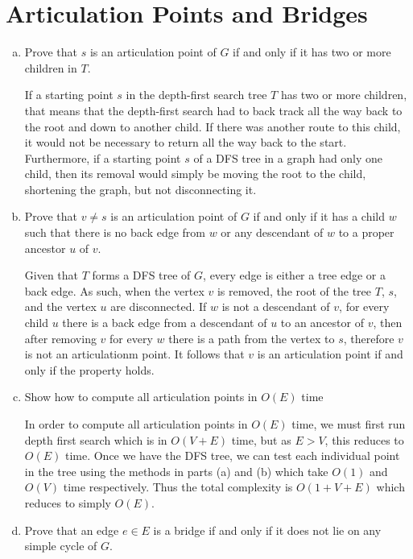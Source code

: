 \documentclass[12pt]{article}
\begin{document}
\section{Articulation Points and Bridges}\label{articulation points}
\begin{enumerate}[(a)]
\item Prove that $s$ is an articulation point of $G$ if and only if it has two or more children in $T$.
\begin{addmargin}[2em]{2em}
If a starting point $s$ in the depth-first search tree $T$ has two or more children, that means that the depth-first search had to back track all the way back to the root and down to another child. If there was another route to this child, it would not be necessary to return all the way back to the start. Furthermore, if a starting point $s$ of a DFS tree in a graph had only one child, then its removal would simply be moving the root to the child, shortening the graph, but not disconnecting it.
\end{addmargin}
\item Prove that $v \neq s$ is an articulation point of $G$ if and only if it has a child $w$ such that there is no back edge from $w$ or any descendant of $w$ to a proper ancestor $u$ of $v$.
\begin{addmargin}[2em]{2em}
Given that $T$ forms a DFS tree of $G$, every edge is either a tree edge or a back edge. As such, when the vertex $v$ is removed, the root of the tree $T$, $s$, and the vertex $u$ are disconnected. If $w$ is not a descendant of $v$, for every child $u$ there is a back edge from a descendant of $u$ to an ancestor of $v$, then after removing $v$ for every $w$ there is a path from the vertex to $s$, therefore $v$ is not an articulationm point. It follows that $v$ is an articulation point if and only if the property holds.
\end{addmargin}
\item Show how to compute all articulation points in $O(E)$ time
\begin{addmargin}[2em]{2em}
In order to compute all articulation points in $O(E)$ time, we must first run depth first search which is in $O(V + E)$ time, but as $E > V$, this reduces to $O(E)$ time. Once we have the DFS tree, we can test each individual point in the tree using the methods in parts (a) and (b) which take $O(1)$ and $O(V)$ time respectively. Thus the total complexity is $O(1 + V + E)$ which reduces to simply $O(E)$.
\end{addmargin}
\item Prove that an edge $e \in E$ is a bridge if and only if it does not lie on any simple cycle of $G$.

\end{enumerate}
\end{document}
